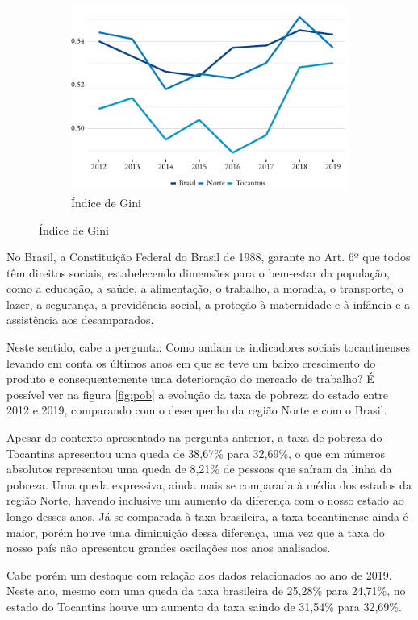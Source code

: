 \begin{figure}[ht]
\begin{subfigure}{\linewidth}
	\end{subfigure}
	\begin{subfigure}{\linewidth}
		\caption{Índice de Gini}
		\label{fig:gini}
		\includegraphics{fig/gini.pdf}
	\end{subfigure}
\end{figure}
\par No Brasil, a Constituição Federal do Brasil de 1988, garante no Art. 6º que todos têm direitos sociais, estabelecendo dimensões para o bem-estar da população, como a educação, a saúde, a alimentação, o trabalho, a moradia, o transporte, o lazer, a segurança, a previdência social, a proteção à maternidade e à infância e a assistência aos desamparados.
\par Neste sentido, cabe a pergunta: Como andam os indicadores sociais tocantinenses levando em conta os últimos anos em que se teve um baixo crescimento do produto e consequentemente uma deterioração do mercado de trabalho? É possível ver na figura \ref{fig:pob} a evolução da taxa de pobreza do estado entre 2012 e 2019, comparando com o desempenho da região Norte e com o Brasil.
\par Apesar do contexto apresentado na pergunta anterior, a taxa de pobreza do Tocantins apresentou uma queda de 38,67\% para 32,69\%, o que em números absolutos representou uma queda de 8,21\% de pessoas que saíram da linha da pobreza. Uma queda expressiva, ainda mais se comparada à média dos estados da região Norte, havendo inclusive um aumento da diferença com o nosso estado ao longo desses anos. Já se comparada à taxa brasileira, a taxa tocantinense ainda é maior, porém houve uma diminuição dessa diferença, uma vez que a taxa do nosso país não apresentou grandes oscilações nos anos analisados.
\par Cabe porém um destaque com relação aos dados relacionados ao ano de 2019. Neste ano, mesmo com uma queda da taxa brasileira de 25,28\% para 24,71\%, no estado do Tocantins houve um aumento da taxa saindo de 31,54\% para 32,69\%.

